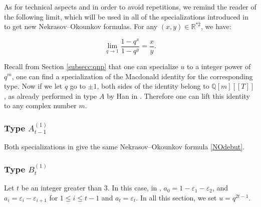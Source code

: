 \documentclass[11pt,letterpaper]{amsart}
\def\bbbr{\mathbb R}
\numberwithin{equation}{section}
\numberwithin{df}{section}
\begin{document}
As for technical aspects and in order to avoid repetitions, we remind the reader of the following limit, which will be used in all of the specializations introduced in \cite[Appendix $1$]{Mac} to get new Nekrasov--Okounkov formulas. For any $(x,y)\in\bbbr^{*2}$, we have:
\begin{center}
$$\underset{q\rightarrow 1}{\lim}\frac{1-q^x}{1-q^y}=\frac{x}{y}.$$
\end{center}

Recall from Section \ref{subsecc:qnp} that one can specialize $u$ to a integer power of $q^m$, one can find a specialization of the Macdonald identity for the corresponding type. Now if we let $q$ go to $\pm 1$, both sides of the identity belong to $\mathbb{Q}[m][[T]]$, as already performed in type $A$ by Han in \cite{Han08}. Therefore one can lift this identity to any complex number $m$.


\subsubsection{Type $A^{(1)}_{t-1}$}

Both specializations in \cite[Appendix $1$]{Mac} give the same Nekrasov--Okounkov formula \eqref{NOdebut}.



\subsubsection{Type $B^{(1)}_{t}$}
Let $t$ be an integer greater than $3$.
In this case, in \cite{Mac}, $a_0=1-\varepsilon_1-\varepsilon_2$, and $a_i=\varepsilon_i-\varepsilon_{i+1}$ for $1\leq i\leq t-1$ and $a_t=\varepsilon_t$.  In all this section, we set $u=q^{2t-1}$.
\end{document}
